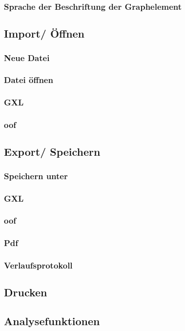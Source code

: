 \documentclass[enabledeprecatedfontcommands,fontsize=11pt,paper=a4,twoside]{scrartcl}
\newcounter{one}
\begin{document}
		\subsubsection{Sprache der Beschriftung der Graphelement}
	\subsection{Import/ Öffnen} \label{import}
		\subsubsection{Neue Datei}
		\subsubsection{Datei öffnen}
		\subsubsection{GXL}
		\subsubsection{oof}
	\subsection{Export/ Speichern} \label{export}
		\subsubsection{Speichern unter}
		\subsubsection{GXL}
		\subsubsection{oof}
		\subsubsection{Pdf}
		\subsubsection{Verlaufsprotokoll}
	\subsection{Drucken} \label{print}
	\subsection{Analysefunktionen} \label{analyse}
\end{document}
